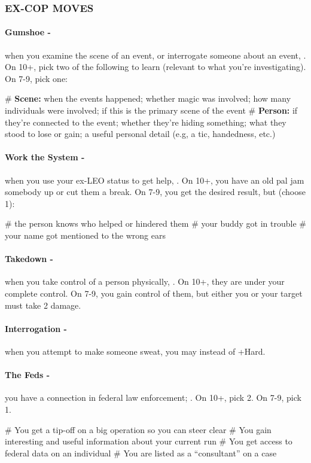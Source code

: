 \subsubsection{EX-COP MOVES}
\paragraph{Gumshoe -} when you examine the scene of an event, or interrogate someone about an event, . On 10+, pick two of the following to learn (relevant to what you’re investigating). On 7-9, pick one:
    \begin{easylist}
        # \textbf{Scene:} when the events happened; whether magic was involved; how many individuals were involved; if this is the primary scene of the event
        # \textbf{Person:} if they’re connected to the event; whether they’re hiding something; what they stood to lose or gain; a useful personal detail (e.g, a tic, handedness, etc.)
    \end{easylist}

\paragraph{Work the System -} when you use your ex-LEO status to get help, . On 10+, you have an old pal jam somebody up or cut them a break. On 7-9, you get the desired result, but (choose 1):
    \begin{easylist}
        # the person knows who helped or hindered them
        # your buddy got in trouble
        # your name got mentioned to the wrong ears        
    \end{easylist}

\paragraph{Takedown -} when you take control of a person physically, . On 10+, they are under your complete control. On 7-9, you gain control of them, but either you or your target must take 2 damage.

\paragraph{Interrogation -} when you attempt to make someone sweat, you may  instead of +Hard.

\paragraph{The Feds -} you have a connection in federal law enforcement; . On 10+, pick 2. On 7-9, pick 1.
    \begin{easylist}
        # You get a tip-off on a big operation so you can steer clear
        # You gain interesting and useful information about your current run
        # You get access to federal data on an individual
        # You are listed as a “consultant” on a case        
    \end{easylist}

